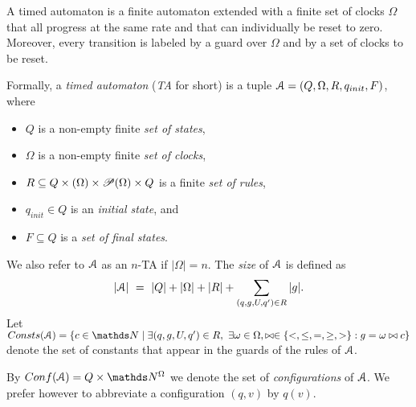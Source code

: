 \iffalse
We define an {\em empty guard} $g_\epsilon$ over a non-empty finite set of clocks
$\Omega$ and to be of the form $\omega \geq 0$ for some 
$\omega \in \Omega$. In particular, we
defined $g_\epsilon$ such that for all $v \in \N^\Omega$ 
we have
$v \models g_\epsilon$, hence $g_\epsilon$ can be used as a guard that is always true. 
\fi



A timed automaton is a finite automaton extended with a finite set of clocks $\Omega$ that all progress at the same rate and that can individually be reset to zero. Moreover, every transition is labeled by a guard over 
$\Omega$  and by a set of clocks to be reset. \\

\par\noindent\ignorespacesafterend
Formally, a {\em timed automaton} ({\em TA} for short) is a tuple
$\mathcal{A}=(Q,\Omega,R,q_{init},F)$, where
\begin{samepage}
\begin{itemize}
	\item $Q$ is a non-empty finite {\em set of states}, 
	\item $\Omega$ is a non-empty finite {\em set of clocks},
	\item $R \subseteq Q\times\relax(\Omega)\times \mathscr{P}(\Omega) \times Q$
	is a finite {\em set of  rules},
	\item $q_{init}\in Q$ is an {\em initial  state}, and 
	\item $F\subseteq Q$ is a {\em set of final states}.
\end{itemize}
\end{samepage}

\par\noindent\ignorespacesafterend
We also refer to $\mathcal{A}$ as an $n$-TA if $|\Omega| = n$. 
The {\em size} of $\mathcal{A}$ is defined as%
$$
|\A| \ = \ |Q|+|\Omega|+|R|+\sum_{(q,g,U,q')\in R}|g|.
$$
Let 
$\Const(\A) = \{ c\in\N \mid \exists(q,g,U,q')\in R, \ \exists \omega \in \Omega, \bowtie\in\{<,\leq,=,\geq,>\} : g = \omega \bowtie c \}$ denote the 
set of constants that appear in the guards of the rules of $\mathcal{A}$.

By $\Conf(\A)=Q\times\N^\Omega$ we denote the set of
{\em configurations} of $\mathcal{A}$. 
We prefer however to abbreviate a configuration	%
$(q,v)$ by $q(v)$.



